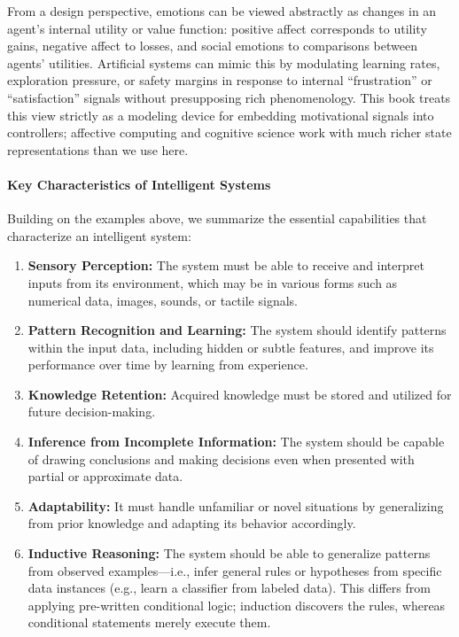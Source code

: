 \begin{tcolorbox}[perspectivebox, title={Emotions as Utility Signals}]
From a design perspective, emotions can be viewed abstractly as changes in an agent's internal utility or value function: positive affect corresponds to utility gains, negative affect to losses, and social emotions to comparisons between agents' utilities. Artificial systems can mimic this by modulating learning rates, exploration pressure, or safety margins in response to internal ``frustration'' or ``satisfaction'' signals without presupposing rich phenomenology. This book treats this view strictly as a modeling device for embedding motivational signals into controllers; affective computing and cognitive science work with much richer state representations than we use here.
\end{tcolorbox}

\paragraph{Key Characteristics of Intelligent Systems}

Building on the examples above, we summarize the essential capabilities that characterize an intelligent system:

\begin{enumerate}
    \item \textbf{Sensory Perception:} The system must be able to receive and interpret inputs from its environment, which may be in various forms such as numerical data, images, sounds, or tactile signals.

    \item \textbf{Pattern Recognition and Learning:} The system should identify patterns within the input data, including hidden or subtle features, and improve its performance over time by learning from experience.

    \item \textbf{Knowledge Retention:} Acquired knowledge must be stored and utilized for future decision-making.

    \item \textbf{Inference from Incomplete Information:} The system should be capable of drawing conclusions and making decisions even when presented with partial or approximate data.

    \item \textbf{Adaptability:} It must handle unfamiliar or novel situations by generalizing from prior knowledge and adapting its behavior accordingly.

    \item \textbf{Inductive Reasoning:} The system should be able to generalize patterns from observed examples---i.e., infer general rules or hypotheses from specific data instances (e.g., learn a classifier from labeled data). This differs from applying pre-written conditional logic; induction discovers the rules, whereas conditional statements merely execute them.
\end{enumerate}

